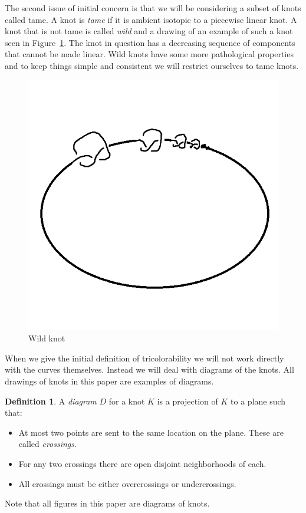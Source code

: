\documentclass[12pt]{amsart}
\theoremstyle{definition}
\newtheorem{definition}[theorem]{Definition}
\theoremstyle{remark}
\numberwithin{equation}{section}
\newcommand{\ds}{.3}
\begin{document}
The second issue of initial concern is that we will be considering a subset of knots called tame. A knot
is \textit{tame} if it is ambient isotopic to a piecewise linear knot. A
knot that is not tame is called \textit{wild} and a drawing of an example of such a knot
seen in Figure~\ref{fig:wild}. The knot in question has a decreasing sequence of
components that cannot be made linear. Wild knots have some more pathological
properties and to keep things simple and consistent we will restrict ourselves to
tame knots.

\begin{figure}
  \includegraphics[scale=\ds]{wild}
  \caption{Wild knot}
  \label{fig:wild}
\end{figure}

When we give the initial definition of  tricolorability we will not work
directly with the curves themselves. Instead we will deal with diagrams
of the knots. All drawings of knots in this paper are examples of diagrams.

\begin{definition}
  A \textit{diagram} $D$ for a knot $K$ is a projection of $K$ to a plane
  such that:
  \begin{itemize}
  \item At most two points are sent to the same location on the plane.
    These are called \textit{crossings}.
  \item For any two crossings there are open disjoint neighborhoods of each.
  \item All crossings must be either overcrossings or undercrossings.
  \end{itemize}
  Note that all figures in this paper are diagrams of knots.
\end{definition}
\end{document}
